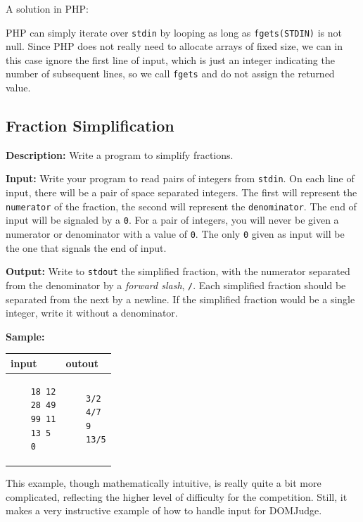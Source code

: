 \documentclass[a4paper]{article}
\begin{document}
A solution in PHP:

PHP can simply iterate over \texttt{stdin} by looping as long as \texttt{fgets(STDIN)} is not null. Since PHP does not really need to allocate arrays of fixed size, we can in this case ignore the first line of input, which is just an integer indicating the number of subsequent lines, so we call \texttt{fgets} and do not assign the returned value.
\newpage

\subsection{Fraction Simplification}
\textbf{Description:} Write a program to simplify fractions.

\textbf{Input:} Write your program to read pairs of integers from \texttt{stdin}. On each line of input, there will be a pair of space separated integers. The first will represent the \texttt{numerator} of the fraction, the second will represent the \texttt{denominator}. The end of input will be signaled by a \texttt{0}. For a pair of integers, you will never be given a numerator or denominator with a value of \texttt{0}. The only \texttt{0} given as input will be the one that signals the end of input. 


\textbf{Output:} Write to \texttt{stdout} the simplified fraction, with the numerator separated from the denominator by a \textit{forward slash}, \texttt{/}. Each simplified fraction should be separated from the next by a newline. If the simplified fraction would be a single integer, write it without a denominator.  

\textbf{Sample:}

\begin{tabular}{|p{}|p{}|}
    \hline
    \textbf{input} & \textbf{outout} \\
    \hline
    \begin{verbatim}
    18 12
    28 49
    99 11
    13 5
    0
    \end{verbatim} &
    \begin{verbatim}
    3/2
    4/7
    9
    13/5
    \end{verbatim} \\
    \hline
\end{tabular}

This example, though mathematically intuitive, is really quite a bit more complicated, reflecting the higher level of difficulty for the competition. Still, it makes a very instructive example of how to handle input for DOMJudge. 
\end{document}
